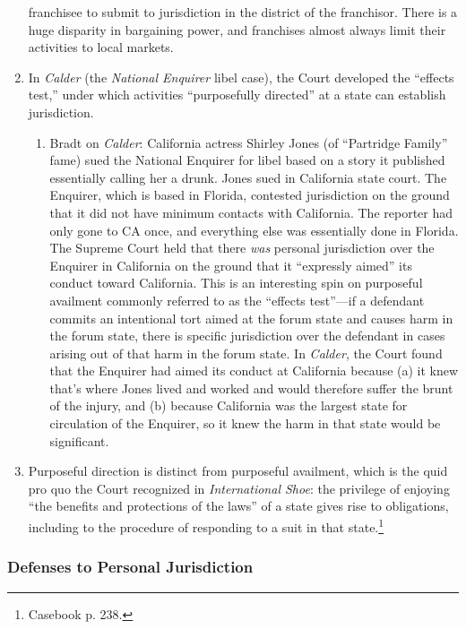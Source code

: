 \begin{enumerate}
    franchisee to submit to jurisdiction in the district of the franchisor. 
    There is a huge disparity in bargaining power, and franchises almost 
    always limit their activities to local markets.
    \item In \emph{Calder} (the \emph{National Enquirer} libel case), the 
    Court developed the ``effects test,'' under which activities ``purposefully 
    directed'' at a state can establish jurisdiction.
    \begin{enumerate}
        \item Bradt on \emph{Calder}: 
        California actress Shirley Jones (of ``Partridge Family'' fame) sued 
        the National Enquirer for libel based on a story it published 
        essentially calling her a drunk. Jones sued in California state 
        court. The Enquirer, which is based in Florida, contested 
        jurisdiction on the ground that it did not have minimum contacts with 
        California. The reporter had only gone to CA once, and everything 
        else was essentially done in Florida. The Supreme Court held that 
        there \emph{was} personal jurisdiction over the Enquirer in California 
        on the ground that it ``expressly aimed'' its conduct toward 
        California. This is an interesting spin on purposeful availment 
        commonly referred to as the ``effects test''---if a defendant commits 
        an intentional tort aimed at the forum state and causes harm in the 
        forum state, there is specific jurisdiction over the defendant in 
        cases arising out of that harm in the forum state. In \emph{Calder}, 
        the Court found that the Enquirer had aimed its conduct at California 
        because (a) it knew that's where Jones lived and worked and would 
        therefore suffer the brunt of the injury, and (b) because California 
        was the largest state for circulation of the Enquirer, so it knew the 
        harm in that state would be significant. 
    \end{enumerate}
    \item Purposeful direction is distinct from purposeful availment, which is 
    the quid pro quo the Court recognized in \emph{International Shoe}: the 
    privilege of enjoying ``the benefits and protections of the laws'' of a 
    state gives rise to obligations, including to the procedure of responding 
    to a suit in that state.\footnote{Casebook p. 238.}
\end{enumerate}

\subsubsection{Defenses to Personal Jurisdiction}

